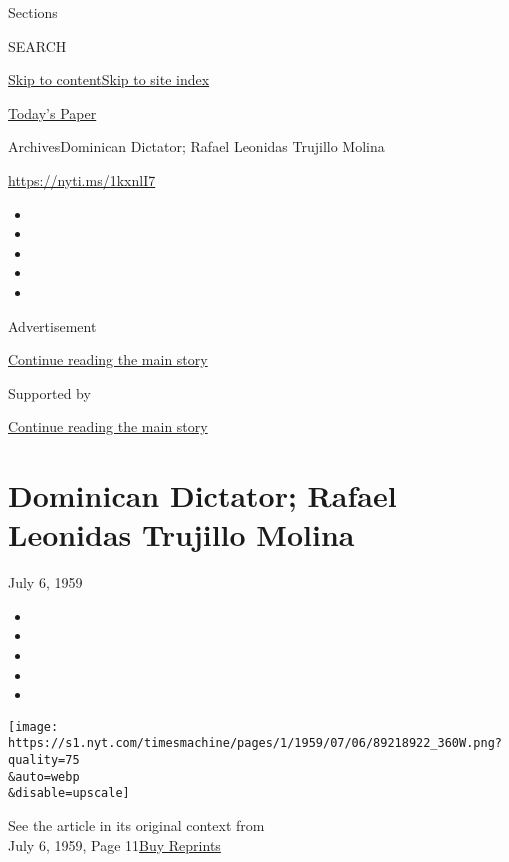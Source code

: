 Sections

SEARCH

\protect\hyperlink{site-content}{Skip to
content}\protect\hyperlink{site-index}{Skip to site index}

\href{https://myaccount.nytimes.com/auth/login?response_type=cookie\&client_id=vi}{}

\href{https://www.nytimes.com/section/todayspaper}{Today's Paper}

Archives\textbar{}Dominican Dictator; Rafael Leonidas Trujillo Molina

\url{https://nyti.ms/1kxnlI7}

\begin{itemize}
\item
\item
\item
\item
\item
\end{itemize}

Advertisement

\protect\hyperlink{after-top}{Continue reading the main story}

Supported by

\protect\hyperlink{after-sponsor}{Continue reading the main story}

\hypertarget{dominican-dictator-rafael-leonidas-trujillo-molina}{%
\section{Dominican Dictator; Rafael Leonidas Trujillo
Molina}\label{dominican-dictator-rafael-leonidas-trujillo-molina}}

July 6, 1959

\begin{itemize}
\item
\item
\item
\item
\item
\end{itemize}

\texttt{[image: https://s1.nyt.com/timesmachine/pages/1/1959/07/06/89218922\_360W.png?quality=75\\\&auto=webp\\\&disable=upscale]}

See the article in its original context from\\
July 6, 1959, Page
11\href{https://store.nytimes.com/collections/new-york-times-page-reprints?utm_source=nytimes\&utm_medium=article-page\&utm_campaign=reprints}{Buy
Reprints}

